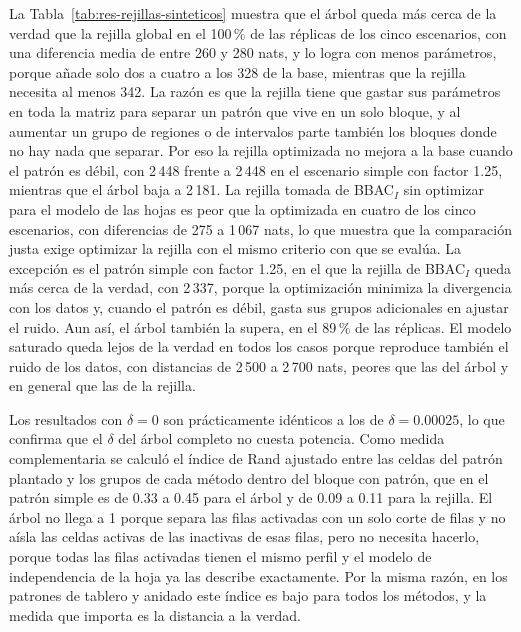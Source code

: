 La Tabla~\ref{tab:res-rejillas-sinteticos} muestra que el árbol queda más cerca de
la verdad que la rejilla global en el 100\,\% de las réplicas de los cinco
escenarios, con una diferencia media de entre 260 y 280 nats, y lo logra con menos
parámetros, porque añade solo dos a cuatro a los 328 de la base, mientras que la
rejilla necesita al menos 342. La razón es que la rejilla tiene que gastar sus
parámetros en toda la matriz para separar un patrón que vive en un solo bloque, y
al aumentar un grupo de regiones o de intervalos parte también los bloques
donde no hay nada que separar. Por eso la rejilla optimizada no mejora a la
base cuando el patrón es débil, con 2\,448 frente a 2\,448 en el escenario simple
con factor 1.25, mientras que el árbol baja a 2\,181. La rejilla tomada de
BBAC$_I$ sin optimizar para el modelo de las hojas es peor que la optimizada en
cuatro de los cinco escenarios, con diferencias de 275 a 1\,067 nats, lo que
muestra que la comparación justa exige optimizar la rejilla con el mismo criterio
con que se evalúa. La excepción es el patrón simple con factor 1.25, en el que la
rejilla de BBAC$_I$ queda más cerca de la verdad, con 2\,337, porque la
optimización minimiza la divergencia con los datos y, cuando el patrón es débil,
gasta sus grupos adicionales en ajustar el ruido. Aun así, el árbol también la
supera, en el 89\,\% de las réplicas. El modelo saturado queda lejos de la verdad en todos los casos porque
reproduce también el ruido de los datos, con distancias de 2\,500 a 2\,700 nats,
peores que las del árbol y en general que las de la rejilla.

Los resultados con $\delta = 0$ son prácticamente idénticos a los de
$\delta = 0.00025$, lo que confirma que el $\delta$ del árbol completo no cuesta
potencia. Como medida complementaria se calculó el índice de Rand ajustado entre
las celdas del patrón plantado y los grupos de cada método dentro del bloque con
patrón, que en el patrón simple es de 0.33 a 0.45 para el árbol y de 0.09 a 0.11
para la rejilla. El árbol no llega a 1 porque separa las filas activadas con un solo
corte de filas y no aísla las celdas activas de las inactivas de esas filas, pero
no necesita hacerlo, porque todas las filas activadas tienen el mismo perfil y el
modelo de independencia de la hoja ya las describe exactamente. Por la misma razón,
en los patrones de tablero y anidado este índice es bajo para todos los métodos,
y la medida que importa es la distancia a la verdad.


